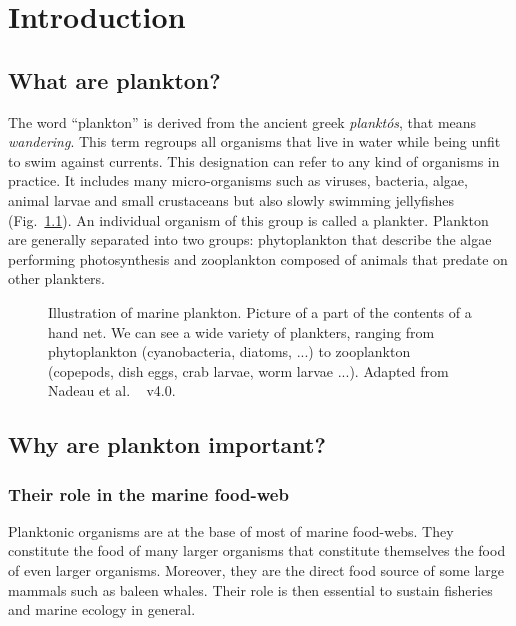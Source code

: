 \chapter{Introduction}\label{chap:intro}

\section{What are plankton?}

The word ``plankton'' is derived from the ancient greek \textit{planktós}, that means \textit{wandering}.
This term regroups all organisms that live in water while being unfit to swim against currents.
This designation can refer to any kind of organisms in practice.
It includes many micro-organisms such as viruses, bacteria, algae, animal larvae and small crustaceans but also slowly swimming jellyfishes (Fig.~\ref{fig:marine_plankton}).
An individual organism of this group is called a plankter.
Plankton are generally separated into two groups: phytoplankton that describe the algae performing photosynthesis and zooplankton composed of animals that predate on other plankters.
\begin{figure}
	\centering
	\def\svgwidth{0.9\textwidth}
	
  	\caption[Illustration of marine plankton.]{
  		Illustration of marine plankton. Picture of a part of the contents of a hand net. 
  		We can see a wide variety of plankters, ranging from phytoplankton (cyanobacteria, diatoms, ...) to zooplankton (copepods, dish eggs, crab larvae, worm larvae ...).
  		Adapted from Nadeau et al. \ccbysa ~ v4.0.
  	}
  	\label{fig:marine_plankton}
\end{figure}

\section{Why are plankton important?}

\subsection{Their role in the marine food-web}

Planktonic organisms are at the base of most of marine food-webs.
They constitute the food of many larger organisms that constitute themselves the food of even larger organisms. 
Moreover, they are the direct food source of some large mammals such as baleen whales.
Their role is then essential to sustain fisheries and marine ecology in general.

